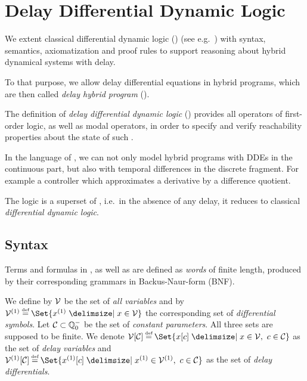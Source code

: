 \chapter{Delay Differential Dynamic Logic}
\label{ch:delay-differential-dynamic-logic}

We extent classical differential dynamic logic (\dL) (see e.g.~\cite{Platzer12LogicsDynSys}) with syntax, semantics, axiomatization and proof rules to support reasoning about hybrid dynamical systems with delay.

To that purpose, we allow delay differential equations in hybrid programs, which are then called \emph{delay hybrid program} (\dHP).

The definition of \emph{delay differential dynamic logic} (\ddL) provides all operators of first-order logic, as well as modal operators, in order to specify and verify reachability properties about the state of such \dHPs.

In the language of \ddL, we can not only model hybrid programs with DDEs in the continuous part, but also with temporal differences in the discrete fragment.
For example a controller which approximates a derivative by a difference quotient.

The logic \ddL is a superset of \dL, i.e.\ in the absence of any delay, it reduces to classical \emph{differential dynamic logic}.


% 


% 


\section{Syntax}
    \label{sec:syntax}

    Terms and formulas in \ddL, as well as \dHPs are defined as \emph{words} of finite length, produced by their corresponding grammars in Backus-Naur-form (BNF).

    We define by $\mathcal{V}$ be the set of \emph{all variables} and by $\diffvars\defeq\Set{\D{x} \with x\in\allvars}$ the corresponding set of \emph{differential symbols}.
    Let $\mathcal{C}_{}\subset\mathbb{Q}^-_0$ be the set of \emph{constant parameters}.
    All three sets are supposed to be finite.
    We denote $\delayvars\defeq\Set{\x[c] \with x\in\allvars,\ c\in\constants}$ as the set of \emph{delay variables} and $\delaydiffvars\defeq\Set{\Dx[c] \with \D{x}\in\diffvars,\ c\in\constants}$ as the set of \emph{delay differentials}.


